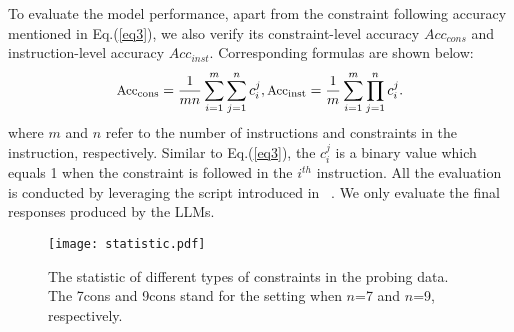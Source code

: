 To evaluate the model performance, apart from the constraint following accuracy mentioned in Eq.(\ref{eq3}), we also verify its constraint-level accuracy $Acc_{cons}$ and instruction-level accuracy $Acc_{inst}$. Corresponding formulas are shown below:
\begin{equation}
    \label{eq5}
    \small
    \text{Acc}_{\text{cons}} = \frac{1}{mn}\sum_{i=1}^{m}\sum_{j=1}^{n}c_i^j,     \text{Acc}_{\text{inst}} = \frac{1}{m}\sum_{i=1}^{m}\prod_{j=1}^{n}c_i^j.
\end{equation}
where $m$ and $n$ refer to the number of instructions and constraints in the instruction, respectively. Similar to Eq.(\ref{eq3}), the $c_i^j$ is a binary value which equals 1 when the constraint is followed in the $i^{th}$ instruction. All the evaluation is conducted by leveraging the script introduced in ~\cite{zhou2023instructionfollowing}. We only evaluate the final responses produced by the LLMs.


\begin{figure}[t] 
    \centering
        \texttt{[image: statistic.pdf]}
    \caption{The statistic of different types of constraints in the probing data. The 7cons and 9cons stand for the setting when $n$=7 and $n$=9, respectively.}
    \label{fig:statistic}
\end{figure}